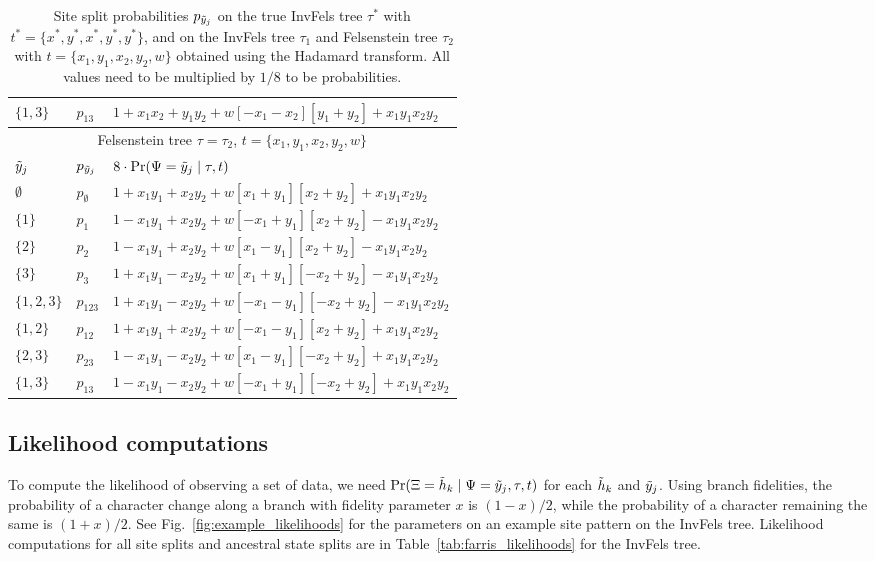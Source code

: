 \begin{table}[ht]
\begin{tabular}{|l|l|l|}
    $\{1,3\}$   & $p_{13}$          &$1 + x_1x_2 +  y_1y_2 +  w[- x_1 - x_2][  y_1 + y_2] + x_1y_1x_2y_2$\\
    \hline
    \multicolumn{3}{c}{Felsenstein tree $\tau=\tau_2$, $t=\{x_1,y_1,x_2,y_2,w\}$}\\
    \hline
$\tilde{y}_j$  & $p_{\tilde{y}_j}$ &$8\cdot\Pr(\Psi=\tilde{y}_j \mid \tau,t)$\\
    \hline
    $\emptyset$ & $p_{\emptyset}$   &$1 + x_1y_1 +  x_2y_2 +  w[  x_1 + y_1][  x_2 + y_2] + x_1y_1x_2y_2$\\
    $\{1\}$     & $p_{1}$           &$1 - x_1y_1 +  x_2y_2 +  w[ -x_1 + y_1][  x_2 + y_2] - x_1y_1x_2y_2$\\
    $\{2\}$     & $p_{2}$           &$1 - x_1y_1 +  x_2y_2 +  w[  x_1 - y_1][  x_2 + y_2] - x_1y_1x_2y_2$\\
    $\{3\}$     & $p_{3}$           &$1 + x_1y_1 -  x_2y_2 +  w[  x_1 + y_1][ -x_2 + y_2] - x_1y_1x_2y_2$\\
    $\{1,2,3\}$ & $p_{123}$         &$1 + x_1y_1 -  x_2y_2 +  w[ -x_1 - y_1][ -x_2 + y_2] - x_1y_1x_2y_2$\\
    $\{1,2\}$   & $p_{12}$          &$1 + x_1y_1 +  x_2y_2 +  w[ -x_1 - y_1][  x_2 + y_2] + x_1y_1x_2y_2$\\
    $\{2,3\}$   & $p_{23}$          &$1 - x_1y_1 -  x_2y_2 +  w[  x_1 - y_1][ -x_2 + y_2] + x_1y_1x_2y_2$\\
    $\{1,3\}$   & $p_{13}$          &$1 - x_1y_1 -  x_2y_2 +  w[ -x_1 + y_1][ -x_2 + y_2] + x_1y_1x_2y_2$\\
    \hline
\end{tabular}
\caption{Site split probabilities $p_{\tilde{y}_j}$ on the true InvFels tree $\tau^*$ with $t^*=\{x^*,y^*,x^*,y^*,y^*\}$, and on the InvFels tree $\tau_1$ and Felsenstein tree $\tau_2$ with $t=\{x_1,y_1,x_2,y_2,w\}$ obtained using the Hadamard transform.
All values need to be multiplied by $1/8$ to be probabilities.}
\label{tab:gen-sitepatprob}
\end{table}

\subsection*{Likelihood computations}

To compute the likelihood of observing a set of data, we need $\Pr(\Xi=\tilde{h}_k \mid \Psi=\tilde{y}_j, \tau, t)$ for each $\tilde{h}_k$ and $\tilde{y}_j$.
Using branch fidelities, the probability of a character change along a branch with fidelity parameter $x$ is $(1-x)/2$, while the probability of a character remaining the same is $(1+x)/2$.
See Fig.~\ref{fig:example_likelihoods} for the parameters on an example site pattern on the InvFels tree.
Likelihood computations for all site splits and ancestral state splits are in Table~\ref{tab:farris_likelihoods} for the InvFels tree.

